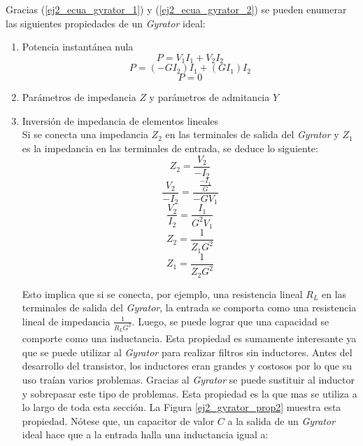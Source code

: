 Gracias (\ref{ej2_ecua_gyrator_1}) y (\ref{ej2_ecua_gyrator_2}) se pueden enumerar las siguientes propiedades de un \textit{Gyrator} ideal:    

\begin{enumerate}
	\item Potencia instantánea nula \\
        \begin{displaymath} P = V_1 I_1 + V_2 I_2 \end{displaymath}
        \begin{displaymath} P = (-G I_2)I_1 + (G I_1) I_2 \end{displaymath}
        \begin{displaymath} P = 0 \end{displaymath}
    
	\item Parámetros de impedancia $Z$ y parámetros de admitancia $Y$ \\
	\item Inversión de impedancia de elementos lineales\\
        Si se conecta una impedancia $Z_2$ en las terminales de salida del \textit{Gyrator} y $Z_1$ es la impedancia en las terminales de entrada, se deduce lo siguiente:
        \begin{displaymath} Z_2 = \frac{V_2}{-I_2} \end{displaymath}
        \begin{displaymath} \frac{V_2}{-I_2} = \frac{\frac{-I_1}{G}}{ -G V_1} \end{displaymath}
        \begin{displaymath} \frac{V_2}{I_2} = \frac{I_1}{G^2 V_1} \end{displaymath}
        \begin{displaymath} Z_2 = \frac{1}{Z_1 G^2} \end{displaymath}
        \begin{displaymath} Z_1 = \frac{1}{Z_2 G^2} \end{displaymath}

        Esto implica que si se conecta, por ejemplo, una resistencia lineal $R_L$ en las terminales de salida del \textit{Gyrator}, la entrada se comporta como
        una resistencia lineal de impedancia $ \frac{1}{R_L G^2} $. Luego, se puede lograr que una capacidad se comporte como una inductancia. Esta propiedad es sumamente interesante
        ya que se puede utilizar al \textit{Gyrator} para realizar filtros sin inductores. Antes del desarrollo del transistor, los inductores eran grandes y costosos por lo que su uso traían varios problemas. Gracias al \textit{Gyrator}
        se puede sustituir al inductor y sobrepasar este tipo de problemas. Esta propiedad es la que mas se utiliza a lo largo de toda esta sección. La Figura \ref{ej2_gyrator_prop2} muestra esta propiedad.
        Nótese que, un capacitor de valor $C$ a la salida de un \textit{Gyrator} ideal hace que a la entrada halla una inductancia igual a:


\end{enumerate}
